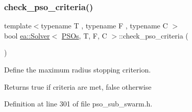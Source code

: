 \mbox{\label{classea_1_1_solver_3_01_p_s_os_00_01_t_00_01_f_00_01_c_01_4_afd7a166bcdc0730431ca9406f0d0e030}} 
\subsubsection{\texorpdfstring{check\+\_\+pso\+\_\+criteria()}{check\_pso\_criteria()}}
{\footnotesize\ttfamily template$<$typename T , typename F , typename C $>$ \\
bool \hyperlink{classea_1_1_solver}{ea\+::\+Solver}$<$ \hyperlink{structea_1_1_p_s_os}{P\+S\+Os}, T, F, C $>$\+::check\+\_\+pso\+\_\+criteria (\begin{DoxyParamCaption}{ }\end{DoxyParamCaption})\hspace{0.3cm}{\ttfamily [private]}}



Define the maximum radius stopping criterion. 

\begin{DoxyReturn}{Returns}
true if criteria are met, false otherwise 
\end{DoxyReturn}


Definition at line 301 of file pso\+\_\+sub\+\_\+swarm.\+h.


